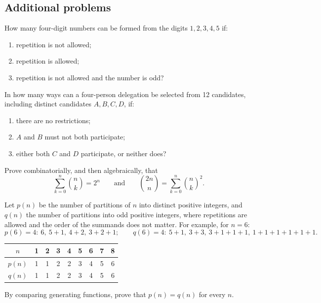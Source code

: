\documentclass[11pt,a4paper]{article}
\newenvironment{enumeratea}{\begin{enumerate}[label=(\alph*),itemsep=0.28em,topsep=0.25em]}{\end{enumerate}}
\newcounter{problem}[section]
\begin{document}
\subsection*{Additional problems}
\begin{problem}
How many four-digit numbers can be formed from the digits $1,2,3,4,5$ if:
\begin{enumeratea}
  \item repetition is not allowed;
  \item repetition is allowed;
  \item repetition is not allowed and the number is odd?
\end{enumeratea}
\end{problem}
\begin{problem}
In how many ways can a four-person delegation be selected from 12 candidates,
including distinct candidates $A,B,C,D$, if:
\begin{enumeratea}
  \item there are no restrictions;
  \item $A$ and $B$ must not both participate;
  \item either both $C$ and $D$ participate, or neither does?
\end{enumeratea}
\end{problem}
\begin{problem}
Prove combinatorially, and then algebraically, that
\[
\sum_{k=0}^n\binom nk=2^n
\qquad\text{and}\qquad
\binom{2n}{n}=\sum_{k=0}^n\binom nk^2.
\]
\end{problem}
\begin{problem}
Let $p(n)$ be the number of partitions of $n$ into distinct positive integers,
and $q(n)$ the number of partitions into odd positive integers, where repetitions
are allowed and the order of the summands does not matter. For example, for $n=6$:
\[
p(6)=4:\ 6,\ 5+1,\ 4+2,\ 3+2+1; \qquad
q(6)=4:\ 5+1,\ 3+3,\ 3+1+1+1,\ 1+1+1+1+1+1.
\]
\begin{center}
\begin{tabular}{c|cccccccc}
  $n$    & 1 & 2 & 3 & 4 & 5 & 6 & 7 & 8 \\ \hline
  $p(n)$ & 1 & 1 & 2 & 2 & 3 & 4 & 5 & 6 \\
  $q(n)$ & 1 & 1 & 2 & 2 & 3 & 4 & 5 & 6
\end{tabular}
\end{center}
By comparing generating functions, prove that $p(n)=q(n)$ for every $n$.
\end{problem}
\end{document}
